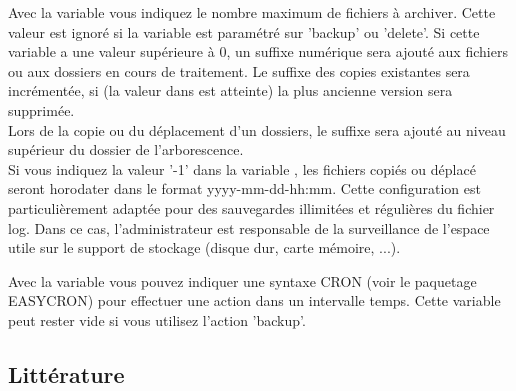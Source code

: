 \begin{description}
  Avec la variable  vous indiquez le nombre maximum
  de fichiers à archiver. Cette valeur est ignoré si la variable
   est paramétré sur 'backup' ou 'delete'. Si cette
  variable a une valeur supérieure à 0, un suffixe numérique sera ajouté aux
  fichiers ou aux dossiers en cours de traitement. Le suffixe des copies
  existantes sera incrémentée, si (la valeur dans 
  est atteinte) la plus ancienne version sera supprimée.\\
  Lors de la copie ou du déplacement d'un dossiers, le suffixe sera ajouté au
  niveau supérieur du dossier de l'arborescence.\\ Si vous indiquez la valeur
  '-1' dans la variable , les fichiers copiés ou
  déplacé seront horodater dans le format yyyy-mm-dd-hh:mm. Cette configuration
  est particulièrement adaptée pour des sauvegardes illimitées et régulières
  du fichier log. Dans ce cas, l'administrateur est responsable de la
  surveillance de l'espace utile sur le support de stockage (disque dur,
  carte mémoire, ...).\\


  Avec la variable  vous pouvez indiquer une
  syntaxe CRON (voir le paquetage EASYCRON) pour effectuer une action dans un
  intervalle temps. Cette variable peut rester vide si vous utilisez l'action
  'backup'.\\

\end{description}

\subsection{Littérature}


